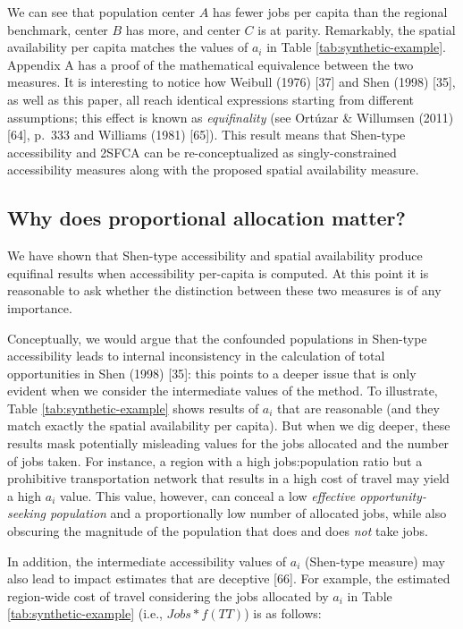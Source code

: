 \documentclass[10pt,letterpaper]{article}
\begin{document}
We can see that population center \(A\) has fewer jobs per capita than
the regional benchmark, center \(B\) has more, and center \(C\) is at
parity. Remarkably, the spatial availability per capita matches the
values of \(a_i\) in Table \ref{tab:synthetic-example}. Appendix A has a
proof of the mathematical equivalence between the two measures. It is
interesting to notice how Weibull (1976) {[}37{]} and Shen (1998)
{[}35{]}, as well as this paper, all reach identical expressions
starting from different assumptions; this effect is known as
\emph{equifinality} (see Ortúzar \& Willumsen (2011) {[}64{]}, p.~333
and Williams (1981) {[}65{]}). This result means that Shen-type
accessibility and 2SFCA can be re-conceptualized as singly-constrained
accessibility measures along with the proposed spatial availability
measure.

\hypertarget{why-does-proportional-allocation-matter}{%
\subsection{Why does proportional allocation
matter?}\label{why-does-proportional-allocation-matter}}

We have shown that Shen-type accessibility and spatial availability
produce equifinal results when accessibility per-capita is computed. At
this point it is reasonable to ask whether the distinction between these
two measures is of any importance.

Conceptually, we would argue that the confounded populations in
Shen-type accessibility leads to internal inconsistency in the
calculation of total opportunities in Shen (1998) {[}35{]}: this points
to a deeper issue that is only evident when we consider the intermediate
values of the method. To illustrate, Table \ref{tab:synthetic-example}
shows results of \(a_i\) that are reasonable (and they match exactly the
spatial availability per capita). But when we dig deeper, these results
mask potentially misleading values for the jobs allocated and the number
of jobs taken. For instance, a region with a high jobs:population ratio
but a prohibitive transportation network that results in a high cost of
travel may yield a high \(a_i\) value. This value, however, can conceal
a low \emph{effective opportunity-seeking population} and a
proportionally low number of allocated jobs, while also obscuring the
magnitude of the population that does and does \emph{not} take jobs.

In addition, the intermediate accessibility values of \(a_i\) (Shen-type
measure) may also lead to impact estimates that are deceptive {[}66{]}.
For example, the estimated region-wide cost of travel considering the
jobs allocated by \(a_i\) in Table \ref{tab:synthetic-example} (i.e.,
\(Jobs*f(TT)\)) is as follows:
\end{document}
